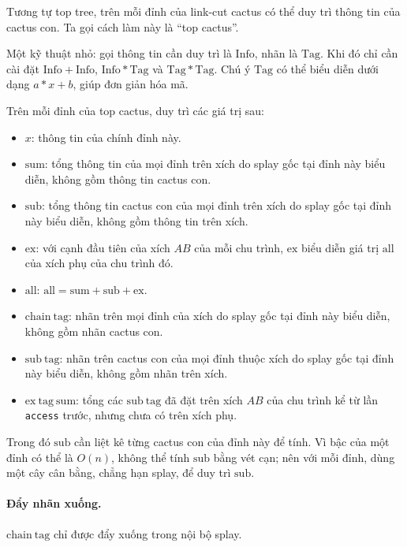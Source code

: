 \documentclass[11pt]{article}
\begin{document}
Tương tự top tree, trên mỗi đỉnh của link-cut cactus có thể duy trì thông tin
của cactus con. Ta gọi cách làm này là ``top cactus''.

Một kỹ thuật nhỏ: gọi thông tin cần duy trì là \(\mathrm{Info}\), nhãn là
\(\mathrm{Tag}\). Khi đó chỉ cần cài đặt
\(\mathrm{Info}+\mathrm{Info}\), \(\mathrm{Info}*\mathrm{Tag}\) và
\(\mathrm{Tag}*\mathrm{Tag}\). Chú ý \(\mathrm{Tag}\) có thể biểu diễn dưới
dạng \(a*x+b\), giúp đơn giản hóa mã.

Trên mỗi đỉnh của top cactus, duy trì các giá trị sau:
\begin{itemize}
  \item \(x\): thông tin của chính đỉnh này.
  \item \(\mathrm{sum}\): tổng thông tin của mọi đỉnh trên xích do splay gốc
  tại đỉnh này biểu diễn, không gồm thông tin cactus con.
  \item \(\mathrm{sub}\): tổng thông tin cactus con của mọi đỉnh trên xích do
  splay gốc tại đỉnh này biểu diễn, không gồm thông tin trên xích.
  \item \(\mathrm{ex}\): với cạnh đầu tiên của xích \(AB\) của mỗi chu trình,
  \(\mathrm{ex}\) biểu diễn giá trị \(\mathrm{all}\) của xích phụ của chu
  trình đó.
  \item \(\mathrm{all}\): \(\mathrm{all}=\mathrm{sum}+\mathrm{sub}+\mathrm{ex}\).
  \item \(\mathrm{chain\ tag}\): nhãn trên mọi đỉnh của xích do splay gốc tại
  đỉnh này biểu diễn, không gồm nhãn cactus con.
  \item \(\mathrm{sub\ tag}\): nhãn trên cactus con của mọi đỉnh thuộc xích do
  splay gốc tại đỉnh này biểu diễn, không gồm nhãn trên xích.
  \item \(\mathrm{ex\ tag\ sum}\): tổng các \(\mathrm{sub\ tag}\) đã đặt trên
  xích \(AB\) của chu trình kể từ lần \texttt{access} trước, nhưng chưa có trên
  xích phụ.
\end{itemize}

Trong đó \(\mathrm{sub}\) cần liệt kê từng cactus con của đỉnh này để tính.
Vì bậc của một đỉnh có thể là \(O(n)\), không thể tính \(\mathrm{sub}\) bằng
vét cạn; nên với mỗi đỉnh, dùng một cây cân bằng, chẳng hạn splay, để duy trì
\(\mathrm{sub}\).

\paragraph{Đẩy nhãn xuống.}
\(\mathrm{chain\ tag}\) chỉ được đẩy xuống trong nội bộ splay.
\end{document}
